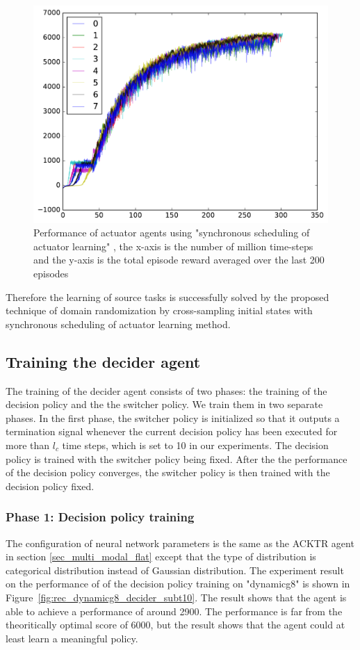 \begin{figure}[!htbp]
	\includegraphics[width=\textwidth]{images/rec_sync_training.pdf}
	\centering
	\caption{Performance of actuator agents using "synchronous scheduling of actuator learning" , the x-axis is the number of million time-steps and the y-axis is the total episode reward averaged over the last 200 episodes}\label{rec_sync_training}
\end{figure}

Therefore the learning of source tasks is successfully solved by the proposed technique of domain randomization by cross-sampling initial states with synchronous scheduling of actuator learning method.
\subsection{Training the decider agent}
The training of the decider agent consists of two phases: the training of the decision policy and the the switcher policy. We train them in two separate phases. In the first phase, the switcher policy is initialized so that it outputs a termination signal whenever the current decision policy has been executed for more than $l_c$ time steps, which is set to 10 in our experiments. The decision policy is trained with the switcher policy being fixed. After the the performance of the decision policy converges, the switcher policy is then trained with the decision policy fixed.

\subsubsection{Phase 1: Decision policy training}
The configuration of neural network parameters is the same as the ACKTR agent in section \ref{sec_multi_modal_flat} except that the type of distribution is categorical distribution instead of Gaussian distribution.
The experiment result on the performance of of the decision policy training on "dynamicg8" is shown in Figure~\ref{fig:rec_dynamicg8_decider_subt10}. The result shows that the agent is able to achieve a performance of around 2900. The performance is far from the theoritically optimal score of 6000, but the result shows that the agent could at least learn a meaningful policy.

